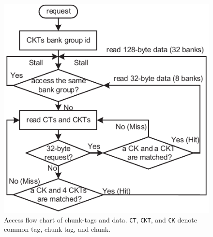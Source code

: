 \begin{figure}
\center
\includegraphics[width=1.0\linewidth]{./fig/flow_chart-eps-converted-to.pdf}
\caption{Access flow chart of chunk-tags and data. \texttt{CT}, \texttt{CKT}, and \texttt{CK} denote common tag, chunk tag, and chunk.}
\label{fig:elastic-cache-flow}
\end{figure}


